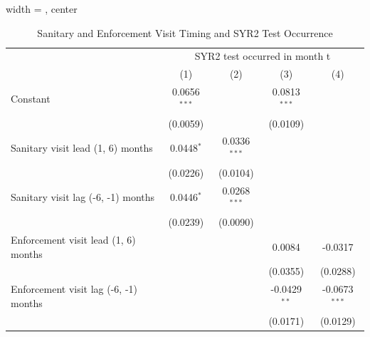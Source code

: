 
\begin{table}[htbp]
   
   \caption{\label{tab:sanitary_visit_syr2_test_iterative} Sanitary and Enforcement Visit Timing and SYR2 Test Occurrence}
   \bigskip
   
   \centering
   
   \begin{adjustbox}{width = \textwidth, center}
      
      
      \begin{tabular}{lcccc}
         \toprule
         
          & \multicolumn{4}{c}{SYR2 test occurred in month t}\\
         
                                                & (1)            & (2)            & (3)            & (4)\\  
         
         \midrule 
         Constant                               & 0.0656$^{***}$ &                & 0.0813$^{***}$ &   \\   
                                                & (0.0059)       &                & (0.0109)       &   \\   
         Sanitary visit lead (1, 6) months      & 0.0448$^{*}$   & 0.0336$^{***}$ &                &   \\   
                                                & (0.0226)       & (0.0104)       &                &   \\   
         Sanitary visit lag (-6, -1) months     & 0.0446$^{*}$   & 0.0268$^{***}$ &                &   \\   
                                                & (0.0239)       & (0.0090)       &                &   \\   
         Enforcement visit lead (1, 6) months   &                &                & 0.0084         & -0.0317\\   
                                                &                &                & (0.0355)       & (0.0288)\\   
         Enforcement visit lag (-6, -1) months  &                &                & -0.0429$^{**}$ & -0.0673$^{***}$\\   
                                                &                &                & (0.0171)       & (0.0129)\\   
         

\end{tabular}
\end{adjustbox}
\end{table}
